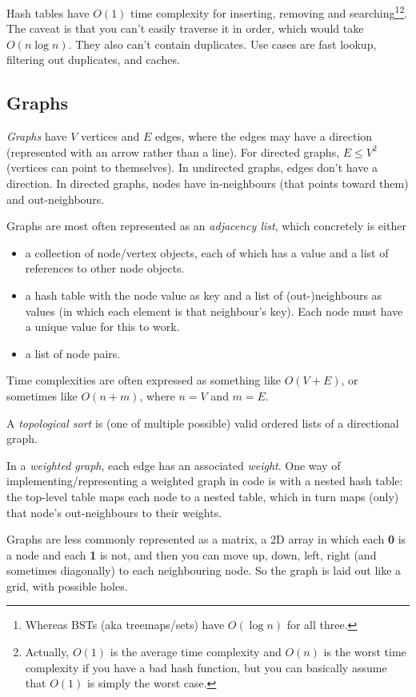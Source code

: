 \documentclass[8pt, table, xcdraw]{article}%
\begin{document}
Hash tables have $O(1)$ time complexity for inserting, removing and searching\footnote{Whereas BSTs (aka treemaps/sets) have $O(\log n)$ for all three.}\footnote{Actually, $O(1)$ is the average time complexity and $O(n)$ is the worst time complexity if you have a bad hash function, but you can basically assume that $O(1)$ is simply the worst case.}. The caveat is that you can't easily traverse it in order, which would take $O(n \log n)$. They also can't contain duplicates. Use cases are fast lookup, filtering out duplicates, and caches.

\subsection{Graphs}

\emph{Graphs} have $V$ vertices and $E$ edges, where the edges may have a direction (represented with an arrow rather than a line). For directed graphs, $E \leq V^2$ (vertices can point to themselves). In undirected graphs, edges don't have a direction. In directed graphs, nodes have in-neighbours (that points toward them) and out-neighbours.

Graphs are most often represented as an \emph{adjacency list}, which concretely is either

\begin{itemize}
    \item a collection of node/vertex objects, each of which has a value and a list of references to other node objects.
    \item a hash table with the node value as key and a list of (out-)neighbours as values (in which each element is that neighbour's key). Each node must have a unique value for this to work.
    \item a list of node pairs.
\end{itemize}

Time complexities are often expressed as something like $O(V + E)$, or sometimes like $O(n + m)$, where $n = V$ and $m = E$.

A \emph{topological sort} is (one of multiple possible) valid ordered lists of a directional graph.

In a \emph{weighted graph}, each edge has an associated \emph{weight}. One way of implementing/representing a weighted graph in code is with a nested hash table: the top-level table maps each node to a nested table, which in turn maps (only) that node's out-neighbours to their weights.

Graphs are less commonly represented as a matrix, a 2D array in which each \textbf{0} is a node and each \textbf{1} is not, and then you can move up, down, left, right (and sometimes diagonally) to each neighbouring node. So the graph is laid out like a grid, with possible holes.
\end{document}
